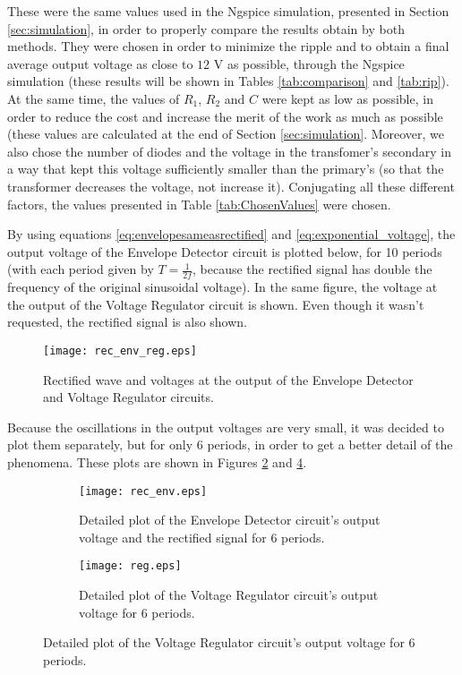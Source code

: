  These were the same values used in the Ngspice simulation, presented in Section \ref{sec:simulation}, in order to properly compare the results obtain by both methods. They were chosen in order to minimize the ripple and to obtain a final average output voltage as close to $12$ V as possible, through the Ngspice simulation (these results will be shown in Tables \ref{tab:comparison} and \ref{tab:rip}). At the same time, the values of $R_1$, $R_2$ and $C$ were kept as low as possible, in order to reduce the cost and increase the merit of the work as much as possible (these values are calculated at the end of Section \ref{sec:simulation}. Moreover, we also chose the number of diodes and the voltage in the transfomer's secondary in a way that kept this voltage sufficiently smaller than the primary's (so that the transformer decreases the voltage, not increase it). Conjugating all these different factors, the values presented in Table \ref{tab:ChosenValues} were chosen.
\par
By using equations \ref{eq:envelopesameasrectified} and \ref{eq:exponential_voltage}, the output voltage of the Envelope Detector circuit is plotted below, for 10 periods (with each period given by $T=\frac{1}{2f}$, because the rectified signal has double the frequency of the original sinusoidal voltage). In the same figure, the voltage at the output of the Voltage Regulator circuit is shown. Even though it wasn't requested, the rectified signal is also shown.


\begin{figure}[H] \centering
  \texttt{[image: rec\_env\_reg.eps]}
  \caption{Rectified wave and voltages at the output of the Envelope Detector and Voltage Regulator circuits.}
  \label{fig:rectified_envelope_regulator_voltages}
\end{figure}

Because the oscillations in the output voltages are very small, it was decided to plot them separately, but for only 6 periods, in order to get a better detail of the phenomena. These plots are shown in Figures \ref{fig:rectified_envelope_voltage} and \ref{fig:regulator_voltage}.

\begin{figure}[H]
  \begin{subfigure}{.49\linewidth}
    \centering
    \texttt{[image: rec\_env.eps]}
    \footnotesize
    \caption{Detailed plot of the Envelope Detector circuit's output voltage and the rectified signal for 6 periods.}
    \label{fig:rectified_envelope_voltage}
  \end{subfigure}
  \hspace{5mm}
  \begin{subfigure}{.49\linewidth}
    \centering
    \texttt{[image: reg.eps]}  
    \caption{Detailed plot of the Voltage Regulator circuit's output voltage for 6 periods.}
    \label{fig:regulator_voltage}
  \end{subfigure}
\end{figure}

